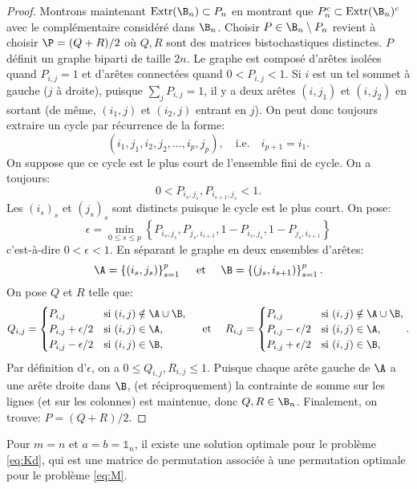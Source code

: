 \begin{proof}
	Montrons maintenant $\text{Extr}(\B_n) \subset P_n$ en montrant que
	$P_n^c \subset \text{Extr}(\B_n)^c$ avec le complémentaire considéré dans $\B_n$.
	Choisir $P \in \B_n \setminus P_n$ revient à choisir $\P = (Q+R)/2$ où $Q,R$ sont des matrices
	bistochastiques distinctes.
	$P$ définit un graphe biparti de taille $2n$.
	Le graphe est composé d'arêtes isolées quand $P_{i,j}=1$ et d'arêtes connectées quand $0 < P_{i,j} <1$.
	Si $i$ est un tel sommet à gauche ($j$ à droite), puisque $\sum_j P_{i,j}=1$, il y a deux arêtes $(i,j_1)$ et $(i,j_2)$ en sortant (de même, $(i_1,j)$ et $(i_2,j)$ entrant en $j$).
	On peut donc toujours extraire un cycle par récurrence de la forme:
	\begin{equation*}
		\left(i_1,j_1,i_2,j_2,\ldots,i_p,j_p\right),
		\quad \text{i.e.}\quad i_{p+1}=i_1.
	\end{equation*}
	On suppose que ce cycle est le plus court de l'ensemble fini de cycle. On a toujours:
	\begin{equation*}
		0 < P_{i_s,j_s}, P_{i_{s+1},j_s} < 1.
	\end{equation*}
	Les $(i_s)_s$ et $(j_s)_s$ sont distincts puisque le cycle est le plus court. On pose:
	\begin{equation*}
		\epsilon = \min_{0 \leq s \leq p} \left\{ P_{i_s,j_s}, P_{j_s,i_{s+1}}, 1-P_{i_s,j_s}, 1-P_{j_s,i_{s+1}} \right\}
	\end{equation*}
	c'est-à-dire $0 < \epsilon < 1$.
	En séparant le graphe en deux ensembles d'arêtes:
	\begin{equation*}
		\A = \left\{(i_s,j_s)\right\}_{s=1}^p
		\quad \text{ et } \quad
		\B = \left\{(j_s,i_{s+1})\right\}_{s=1}^p.
	\end{equation*}
	On pose $Q$ et $R$ telle que:
	\begin{equation*}
		Q_{i,j} =
		\begin{cases}
			P_{i,j}            & \text{si } (i,j) \notin \A \cup \B, \\
			P_{i,j}+\epsilon/2 & \text{si } (i,j) \in \A,            \\
			P_{i,j}-\epsilon/2 & \text{si } (i,j) \in \B,
		\end{cases}
		\quad \text{ et }\quad
		R_{i,j} =
		\begin{cases}
			P_{i,j}            & \text{si } (i,j) \notin \A \cup \B, \\
			P_{i,j}-\epsilon/2 & \text{si } (i,j) \in \A,            \\
			P_{i,j}+\epsilon/2 & \text{si } (i,j) \in \B,
		\end{cases}.
	\end{equation*}
	Par définition d'$\epsilon$, on a $0 \leq Q_{i,j}, R_{i,j} \leq 1$.
	Puisque chaque arête gauche de $\A$ a une arête droite dans $\B$, (et réciproquement) la
	contrainte de somme sur les lignes (et sur les colonnes) est maintenue, donc $Q,R \in \B_n$. Finalement, on trouve: $P=(Q+R)/2$.
\end{proof}

\begin{corollaire}
	Pour $m = n$ et $a = b = \mathds{1}_{n}$, il existe une solution optimale pour le problème \ref{eq:Kd}, qui est une matrice de permutation associée à une permutation optimale pour le problème \ref{eq:M}.
\end{corollaire}


